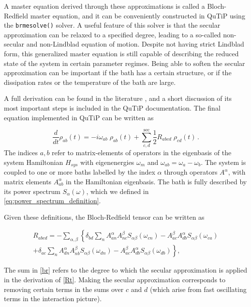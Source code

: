 \documentclass[preprint,3p,sort&compress]{elsarticle}
\def\code#1{\texttt{#1}}
\begin{document}
A master equation derived through these approximations is called a Bloch-Redfield master equation, and it can be conveniently constructed in QuTiP using the \code{brmesolve()} solver.  A useful feature of this solver is that the secular approximation can be relaxed to a specified degree, leading to a so-called non-secular and non-Lindblad equation of motion. Despite not having strict Lindblad form, this generalized master equation is still capable of describing the reduced state of the system in certain parameter regimes.  Being able to soften the secular approximation can be important if the bath has a certain structure, or if the dissipation rates or the temperature of the bath are large.

A full derivation can be found in the literature \cite{breuer2002theory}, and a short discussion of its most important steps is included in the QuTiP documentation. The final equation implemented in QuTiP can be written as

\begin{equation}
  \frac{d}{dt}\rho_{ab}(t)
    =
    -i\omega_{ab}\;\rho_{ab}(t)
    +
    \sum_{c,d}^{\mathrm{sec}}\frac{1}{2}R_{abcd}\;\rho_{cd}(t) \, .\label{br}
\end{equation}
The indices $a,b$ refer to matrix-elements of operators in the eigenbasis of the system Hamiltonian $H_{sys}$ with eigenenergies $\omega_m$ and $\omega_{ab}=\omega_a-\omega_b$. The system is coupled to one or more baths labelled by the index $\alpha$ through operators $A^{\alpha}$, with matrix elements $A^{\alpha}_{ab}$ in the Hamiltonian eigenbasis.  The bath is fully described by its power spectrum $S_{\alpha}(\omega)$, which we defined in \eqref{eq:power_spectrum_definition}.

Given these definitions, the Bloch-Redfield tensor can be written as 



\begin{align} R_{abcd} =  -\sum_{\alpha,\beta}
 \left\{
 \delta_{bd}\sum_nA^\alpha_{an}A^\beta_{nc}S_{\alpha\beta}(\omega_{cn})
 -
 A^\beta_{ac} A^\alpha_{db} S_{\alpha\beta}(\omega_{ca})
 \right. \nonumber\\
+
 \left.
 \delta_{ac}\sum_n A^\alpha_{dn}A^\beta_{nb} S_{\alpha\beta}(\omega_{dn})
 -
 A^\beta_{ac}A^\alpha_{db} S_{\alpha\beta}(\omega_{db})
 \right\},\label{Rt} \end{align}

The sum in \eqref{br} refers to the degree to which the secular approximation is applied in the derivation of \eqref{Rt}.  Making the secular approximation corresponds to removing certain terms in the sums over $c$ and $d$ (which arise from fast oscillating terms in the interaction picture). 
\end{document}
